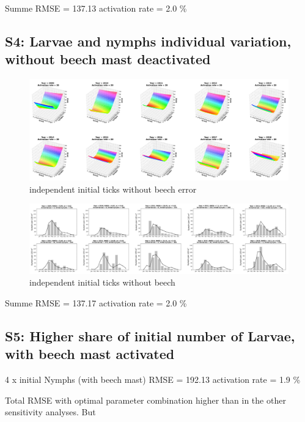 \documentclass[a4paper, 11pt]{scrartcl}
\begin{document}
Summe RMSE = 137.13
activation rate = 2.0 \%

\newpage
\subsection{S4: Larvae and nymphs individual variation, without beech mast deactivated}


\begin{figure}[h!]
\centering
\includegraphics[width=1.0\textwidth]{figures/independent_initial_ticks_without_beech_error.PNG}
\caption{independent initial ticks without beech error}
\label{fig:independent_initial_ticks_without_beech_error}
\end{figure}

\begin{figure}[h!]
\centering
\includegraphics[width=1.0\textwidth]{figures/independent_initial_ticks_without_beech.PNG}
\caption{independent initial ticks without beech}
\label{fig:independent_initial_ticks_without_beech}
\end{figure}

Summe RMSE = 137.17
activation rate = 2.0 \%


\subsection{S5: Higher share of initial number of Larvae, with beech mast activated}
4 x initial Nymphs (with beech mast)
RMSE = 192.13
activation rate = 1.9 \%

Total RMSE with optimal parameter combination higher than in the other sensitivity analyses. But
\end{document}
